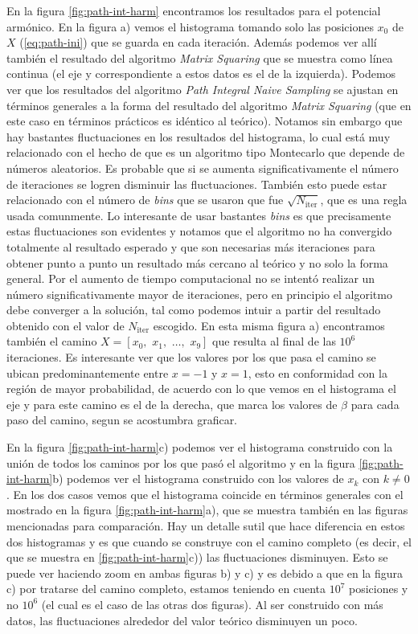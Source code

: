 \documentclass[%
 reprint,
 amsmath,amssymb,
 aps,
 pra,
]{revtex4-2}
\begin{document}
En la figura \ref{fig:path-int-harm} encontramos los resultados para el potencial armónico. En la figura a) vemos el histograma tomando solo las posiciones $x_0$ de  $X$ (\ref{eq:path-ini}) que se guarda en cada iteración. Además podemos ver allí también el resultado del algoritmo \textit{Matrix Squaring} que se muestra como línea continua (el eje y correspondiente a estos datos es el de la izquierda). Podemos ver que los resultados del algoritmo \textit{Path Integral Naive Sampling} se ajustan en términos generales a la forma del resultado del algoritmo \textit{Matrix Squaring} (que en este caso en términos prácticos es idéntico al teórico). Notamos sin embargo que hay bastantes fluctuaciones en los resultados del histograma, lo cual está muy relacionado con el hecho de que es un algoritmo tipo Montecarlo que depende de números aleatorios. Es probable que si se aumenta significativamente el número de iteraciones se logren disminuir las fluctuaciones. También esto puede estar relacionado con el número de \textit{bins} que se usaron que fue $\sqrt{N_\mathrm{iter}}$, que es una regla usada comunmente. Lo interesante de usar bastantes \textit{bins} es que precisamente estas fluctuaciones son evidentes y notamos que el algoritmo no ha convergido totalmente al resultado esperado y que son necesarias más iteraciones para obtener punto a punto un resultado más cercano al teórico y no solo la forma general. Por el aumento de tiempo computacional no se intentó realizar un número significativamente mayor de iteraciones, pero en principio el algoritmo debe converger a la solución, tal como podemos intuir a partir del resultado obtenido con el valor de $N_\mathrm{iter}$ escogido. En esta misma figura a) encontramos también el camino $X=[x_0,\,\,x_1,\,\,\dots,\,\,x_{9}]$ que resulta al final de las $10^6$ iteraciones. Es interesante ver que los valores por los que pasa el camino se ubican predominantemente entre $x=-1$ y $x=1$, esto en conformidad con la región de mayor probabilidad, de acuerdo con lo que vemos en el histograma el eje y para este camino es el de la derecha, que marca los valores de $\beta$ para cada paso del camino, segun se acostumbra graficar.

En la figura \ref{fig:path-int-harm}c) podemos ver el histograma construido con la unión de todos los caminos por los que pasó el algoritmo y en  la figura \ref{fig:path-int-harm}b) podemos ver el histograma construido con los valores de $x_k$ con $k \neq 0$. En los dos casos vemos que el histograma coincide en términos generales con el mostrado en la figura \ref{fig:path-int-harm}a), que se muestra también en las figuras mencionadas para comparación. Hay un detalle sutil que hace diferencia en estos dos histogramas y es que cuando se construye con el camino completo (es decir, el que se muestra en \ref{fig:path-int-harm}c)) las fluctuaciones disminuyen. Esto se puede ver haciendo zoom en ambas figuras b) y c) y es debido a que en la figura c) por tratarse del camino completo, estamos teniendo en cuenta $10^7$ posiciones y no $10^6$ (el cual es el caso de las otras dos figuras). Al ser construido con más datos, las fluctuaciones alrededor del valor teórico disminuyen un poco.
\end{document}
